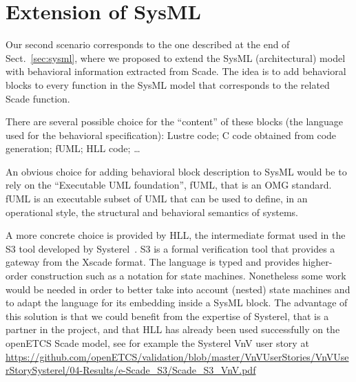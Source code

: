 \documentclass{template/openetcs_report}
\begin{document}
\section{Extension of SysML}
\label{sec:sysml-variant}

Our second scenario corresponds to the one described at the end of
Sect.~\ref{sec:sysml}, where we proposed to extend the SysML
(architectural) model with behavioral information extracted from Scade.
The idea is to add behavioral blocks to every function in the SysML
model that corresponds to the related Scade function.

There are several possible choice for the ``content'' of these blocks
(the language used for the behavioral specification): Lustre code; C
code obtained from code generation; fUML; HLL code; \dots

An obvious choice for adding behavioral block description to SysML
would be to rely on the ``Executable UML foundation'', fUML, that is
an OMG standard. fUML is an executable subset of UML that can be used
to define, in an operational style, the structural and behavioral
semantics of systems.

A more concrete choice is provided by HLL, the intermediate format
used in the S3 tool developed by
Systerel~\cite{S3,DBLP:conf/fmics/Petit-DocheBCFG15}. S3 is a formal
verification tool that provides a gateway from the Xscade format. The
language is typed and provides higher-order construction such as a
notation for state machines. Nonetheless some work would be needed in
order to better take into account (nested) state machines and to adapt
the language for its embedding inside a SysML block. The advantage of
this solution is that we could benefit from the expertise of Systerel,
that is a partner in the project, and that HLL has already been used
successfully on the openETCS Scade model, see for example the Systerel
VnV user story at
\url{https://github.com/openETCS/validation/blob/master/VnVUserStories/VnVUserStorySysterel/04-Results/e-Scade_S3/Scade_S3_VnV.pdf}
\end{document}
